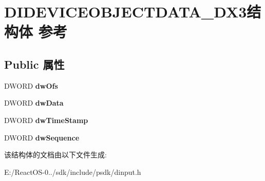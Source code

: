 \hypertarget{struct_d_i_d_e_v_i_c_e_o_b_j_e_c_t_d_a_t_a___d_x3}{}\section{D\+I\+D\+E\+V\+I\+C\+E\+O\+B\+J\+E\+C\+T\+D\+A\+T\+A\+\_\+\+D\+X3结构体 参考}
\label{struct_d_i_d_e_v_i_c_e_o_b_j_e_c_t_d_a_t_a___d_x3}
\subsection*{Public 属性}
\begin{DoxyCompactItemize}
\item 
\mbox{\label{struct_d_i_d_e_v_i_c_e_o_b_j_e_c_t_d_a_t_a___d_x3_a1b69f544cd602fd928f8b239daae046d}} 
D\+W\+O\+RD {\bfseries dw\+Ofs}
\item 
\mbox{\label{struct_d_i_d_e_v_i_c_e_o_b_j_e_c_t_d_a_t_a___d_x3_a5388cbb0d818fe75f296c23b7a137a3d}} 
D\+W\+O\+RD {\bfseries dw\+Data}
\item 
\mbox{\label{struct_d_i_d_e_v_i_c_e_o_b_j_e_c_t_d_a_t_a___d_x3_a502e24c37c33eb55e9b379695c3c5dc8}} 
D\+W\+O\+RD {\bfseries dw\+Time\+Stamp}
\item 
\mbox{\label{struct_d_i_d_e_v_i_c_e_o_b_j_e_c_t_d_a_t_a___d_x3_a503f905cf191281a63d19b6bcbf8764d}} 
D\+W\+O\+RD {\bfseries dw\+Sequence}
\end{DoxyCompactItemize}


该结构体的文档由以下文件生成\+:\begin{DoxyCompactItemize}
\item 
E\+:/\+React\+O\+S-\/0../sdk/include/psdk/dinput.\+h\end{DoxyCompactItemize}
